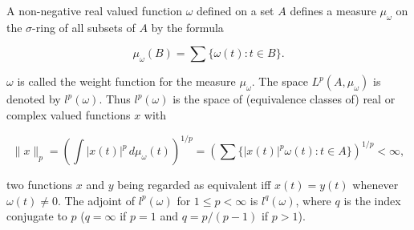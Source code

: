 A non-negative real valued function $\omega$ defined on a set $A$ defines a measure $\mu_\omega$ on the $\sigma$-ring of all subsets of $A$ by the formula

$$\mu_\omega(B) = \sum \{\omega(t): t \in B\}.$$

$\omega$ is called the weight function for the measure $\mu_\omega$. The space $L^p(A, \mu_\omega)$ is denoted by $l^p(\omega)$. Thus $l^p(\omega)$ is the space of (equivalence classes of) real or complex valued functions $x$ with

$$\|x\|_p = \left( \int |x(t)|^p \, d\mu_\omega(t) \right)^{1/p} = \left( \sum \{|x(t)|^p \omega(t): t \in A \}\right)^{1/p} < \infty,$$

two functions $x$ and $y$ being regarded as equivalent iff $x(t) = y(t)$ whenever $\omega(t) \neq 0$. The adjoint of $l^p(\omega)$ for $1 \leq p < \infty$ is $l^q(\omega)$, where $q$ is the index conjugate to $p$ ($q = \infty$ if $p = 1$ and $q = p/(p-1)$ if $p > 1$).
